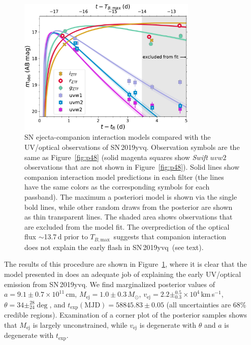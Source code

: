 \documentclass[twocolumn]{aastex63}
\newcommand{\tbmax}{$T_{B,\mathrm{max}}$}
\newcommand{\kms}{km\,s$^{-1}$}
\newcommand{\sn}{SN\,2019yvq}
\begin{document}
\begin{figure}
    \centering
    \includegraphics[width=3.35in]{./figures/sn_companion_models.pdf}
    \caption{SN ejecta-companion interaction models compared with the
    UV/optical observations of \sn. Observation symbols are the same as
    Figure~\ref{fig:p48} (solid magenta squares show \textit{Swift} $uvw2$
    observations that are not shown in Figure~\ref{fig:p48}). Solid lines show
    companion interaction model predictions in each filter (the lines have the
    same colors as the corresponding symbols for each passband). The maximum a
    posteriori model is shown via the single bold lines, while other random
    draws from the posterior are shown as thin transparent lines. The shaded
    area shows observations that are excluded from the model fit. The
    overprediction of the optical flux $\sim$13.7\,d prior to \tbmax\ suggests
    that companion interaction does not explain the early flash in \sn\ (see
    text).}
    \label{fig:companion}
\end{figure}

The results of this procedure are shown in Figure~\ref{fig:companion}, where
it is clear that the model presented in \citet{Kasen10a} does an adequate job
of explaining the early UV/optical emission from \sn. We find marginalized
posterior values of $a = 9.1 \pm 0.7 \times 10^{11}$\,cm, $M_\mathrm{ej} = 1.0
\pm 0.3\,M_\odot$, $v_\mathrm{ej} = 2.2 \pm^{0.5}_{0.3} \times 10^{4}$\,\kms,
$\theta = 34 \pm^{28}_{24} \deg$, and $t_\mathrm{exp}(\mathrm{MJD}) = 58845.83
\pm 0.05$ (all uncertainties are 68\% credible regions). Examination of a
corner plot of the posterior samples shows that $M_\mathrm{ej}$ is largely
unconstrained, while $v_\mathrm{ej}$ is degenerate with $\theta$ and $a$ is
degenerate with $t_\mathrm{exp}$. 
\end{document}

